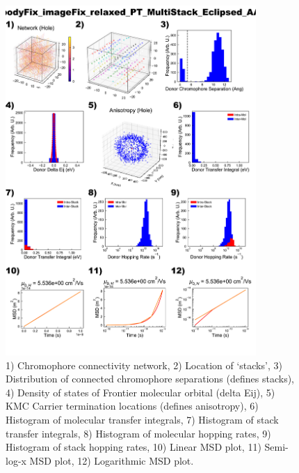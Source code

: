 \documentclass[12pt]{article}
\begin{document}
\begin{figure}[h]\centering
	\includegraphics[width=0.85\textwidth]{Figures/bodyFix_imageFix_relaxed_PT_MultiStack_Eclipsed_AA.png}
    \caption{   1) Chromophore connectivity network, 
                2) Location of `stacks', 
                3) Distribution of connected chromophore separations (defines stacks),
                4) Density of states of Frontier molecular orbital (delta Eij),
                5) KMC Carrier termination locations (defines anisotropy),
                6) Histogram of molecular transfer integrals,
                7) Histogram of stack transfer integrals,
                8) Histogram of molecular hopping rates,
                9) Histogram of stack hopping rates,
                10) Linear MSD plot,
                11) Semi-log-x MSD plot,
                12) Logarithmic MSD plot.}
	\label{fig:PTMultEcl}
\end{figure}
\end{document}
